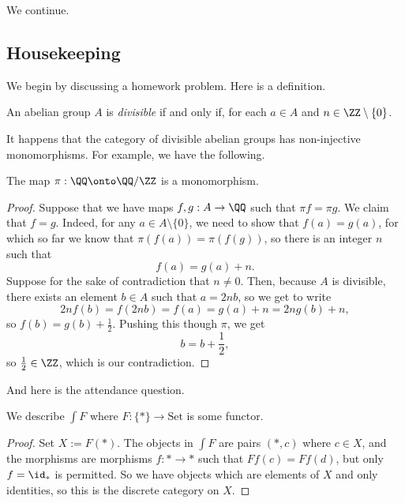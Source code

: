 
We continue.

\subsection{Housekeeping}
We begin by discussing a homework problem. Here is a definition.
\begin{definition}[Divisible]
	An abelian group $A$ is \textit{divisible} if and only if, for each $a\in A$ and $n\in\ZZ\setminus\{0\}$.
\end{definition}
It happens that the category of divisible abelian groups has non-injective monomorphisms. For example, we have the following.
\begin{exe}
	The map $\pi:\QQ\onto\QQ/\ZZ$ is a monomorphism.
\end{exe}
\begin{proof}
	Suppose that we have maps $f,g:A\to\QQ$ such that $\pi f=\pi g$. We claim that $f=g$. Indeed, for any $a\in A\setminus\{0\}$, we need to show that $f(a)=g(a)$, for which so far we know that $\pi(f(a))=\pi(f(g))$, so there is an integer $n$ such that
	\[f(a)=g(a)+n.\]
	Suppose for the sake of contradiction that $n\ne0$. Then, because $A$ is divisible, there exists an element $b\in A$ such that $a=2nb$, so we get to write
	\[2nf(b)=f(2nb)=f(a)=g(a)+n=2ng(b)+n,\]
	so $f(b)=g(b)+\frac12$. Pushing this though $\pi$, we get
	\[b=b+\frac12,\]
	so $\frac12\in\ZZ$, which is our contradiction.
\end{proof}

And here is the attendance question.
\begin{exe}
	We describe $\int F$ where $F:\{*\}\to\mathrm{Set}$ is some functor.
\end{exe}
\begin{proof}
	Set $X:=F(*)$. The objects in $\int F$ are pairs $(*,c)$ where $c\in X$, and the morphisms are morphisms $f:*\to*$ such that $Ff(c)=Ff(d)$, but only $f=\id_*$ is permitted. So we have objects which are elements of $X$ and only identities, so this is the discrete category on $X$.
\end{proof}

